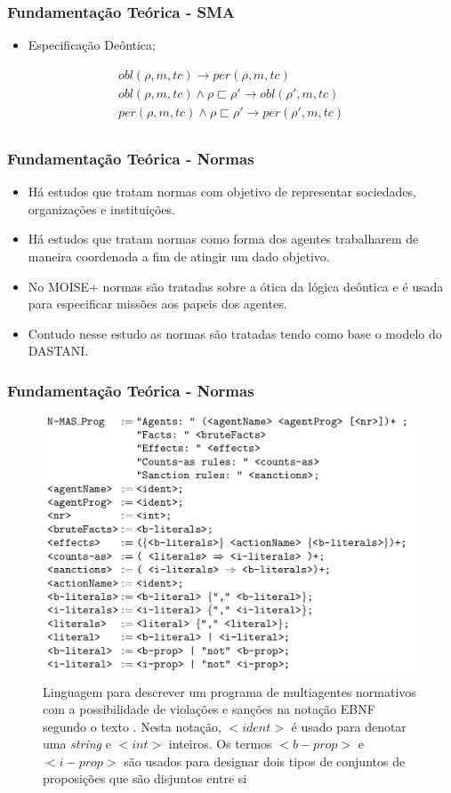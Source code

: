 \documentclass{beamer}
\begin{document}
\begin{frame}
\frametitle{Fundamentação Teórica - SMA}
	\begin{itemize}
		\item Especificação Deôntica; 
	\end{itemize}
	\begin{eqnarray}\nonumber
		obl(\rho,m,tc) \to per(\rho,m,tc) \\
		obl(\rho,m,tc) \wedge \rho \sqsubset \rho' \to obl(\rho',m,tc) \\
		per(\rho,m,tc) \wedge \rho \sqsubset \rho' \to per(\rho',m,tc) \\	
	\end{eqnarray}
\end{frame}

\begin{frame}
\frametitle{Fundamentação Teórica - Normas}
	\begin{itemize}
		\item Há estudos que tratam normas com objetivo de representar sociedades, organizações e instituições.
		\item Há estudos que tratam normas como forma dos agentes trabalharem de maneira coordenada a fim de atingir um dado objetivo. 
		\item No MOISE+ normas são tratadas sobre a ótica da lógica deôntica e é usada para especificar missões aos papeis dos agentes.
		\item Contudo nesse estudo as normas são tratadas tendo como base o modelo do DASTANI. 
	\end{itemize}
\end{frame}

\begin{frame}
	\frametitle{Fundamentação Teórica - Normas}
	\begin{figure}[H]
	  \centering
	  \includegraphics[width=0.5\linewidth]{figure/masprogram.png} 
	  \caption{Linguagem para descrever um programa de multiagentes normativos com a possibilidade de violações e sanções na notação EBNF segundo o texto \cite{dastaniframework}. Nesta notação, $<ident>$ é usado para denotar uma \textit{string} e $<int>$ inteiros. Os termos $<b-prop>$ e $<i-prop>$ são usados para designar dois tipos de conjuntos de proposições que são disjuntos entre si}
	  \label{descreveprograma}
	\end{figure}
\end{frame}
\end{document}
